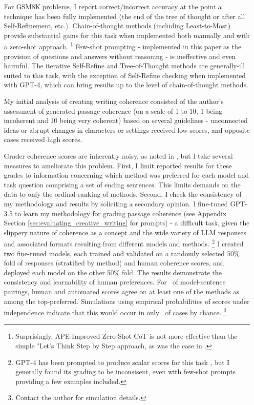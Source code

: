 \documentclass[11pt]{article}
\begin{document}
\begin{centering}


\end{centering}

For GSM8K problems, I report correct/incorrect accuracy at the point a technique has been fully implemented (the end of the tree of thought or after all Self-Refinement, etc.). Chain-of-thought methods (including Least-to-Most) provide substantial gains for this task when implemented both manually and with a zero-shot approach. \footnote{Surprisingly, APE-Improved Zero-Shot CoT is not more effective than the simple "Let's Think Step by Step approach, as was the case in \citealp{zhou_large_2022}.} Few-shot prompting - implemented in this paper as the provision of questions and answers without reasoning - is ineffective and even harmful. The iterative Self-Refine and Tree-of-Thought methods are generally-ill suited to this task, with the exception of Self-Refine checking when implemented with GPT-4, which can bring results up to the level of chain-of-thought methods.

%

My initial analysis of creating writing coherence consisted of the author's assessment of generated passage coherence (on a scale of 1 to 10, 1 being incoherent and 10 being very coherent) based on several guidelines - unconnected ideas or abrupt changes in characters or settings received low scores, and opposite cases received high scores.

Grader coherence scores are inherently noisy, as noted in \citealp{yao_tree_2023}, but I take several measures to ameliorate this problem. First, I limit reported results for these grades to information concerning which method was preferred for each model and task question comprising a set of ending sentences. This limits demands on the data to only the ordinal ranking of methods. Second, I check the consistency of my methodology and results by soliciting a secondary opinion. I fine-tuned GPT-3.5 to learn my methodology for grading passage coherence (see Appendix Section \ref{sec:evaluating_creative_writing} for prompts) - a difficult task, given the slippery nature of coherence as a concept and the wide variety of LLM responses and associated formats resulting from different models and methods. \footnote{GPT-4 has been prompted to produce scalar scores for this task \cite{yao_tree_2023}, but I generally found its grading to be inconsisent, even with few-shot prompts providing a few examples included.} I created two fine-tuned models, each trained and validated on a randomly selected 50\% fold of responses (stratified by method) and human coherence scores, and deployed each model on the other 50\% fold. The results demonstrate the consistency and learnability of human preferences. For \pAtlOneHumanEqAggPct~of model-sentence pairings, human and automated scores agree on at least one of the methods as among the top-preferred. Simulations using empirical probabilities of scores under independence indicate that this would occur in only \simProbAgmtCmplStr~of cases by chance. \footnote{Contact the author for simulation details.}
\end{document}
